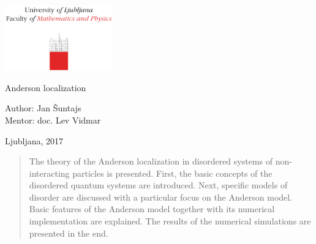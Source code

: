 \documentclass[10pt,a4paper]{article}
\begin{document}


\begin{center}

\includegraphics[width=0.35\textwidth]{logo_fmf_uni-lj_en.pdf}\\[8ex] 

\vspace{3mm}


\vspace{2 cm}

{ \Large }Anderson localization\\             
\vspace{3cm}


{\large Author: Jan Šuntajs\\
\large Mentor: doc. Lev Vidmar \\
\vspace{2cm}



Ljubljana, 2017}
\vfill
\begin{abstract}
The theory of the Anderson localization in disordered systems of non-interacting particles is presented. First, the basic concepts of the disordered quantum systems are introduced. Next, specific models of disorder are discussed with a particular focus on the Anderson model. Basic features of the Anderson model together with its numerical implementation are explained. The results of the numerical simulations are presented in the end.  

\end{abstract}

\end{center}

\cleardoublepage

\thispagestyle{empty}


\clearpage
\pagestyle{fancy}
\fancyhf{}
\cfoot{\thepage}
\setcounter{page}{1}
\end{document}
